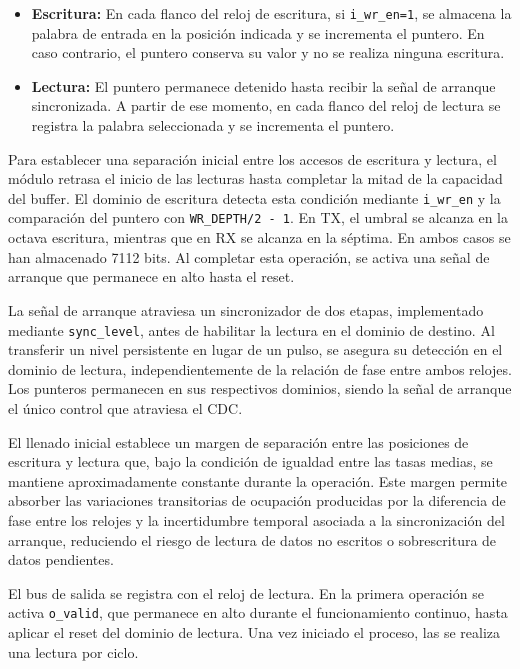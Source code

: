 \documentclass[10pt,a4paper]{article}
\begin{document}
\begin{itemize}
    \item \textbf{Escritura:}
    En cada flanco del reloj de escritura, si
    \texttt{i\_wr\_en=1}, se almacena la palabra de entrada
    en la posición indicada y se incrementa el puntero.
    En caso contrario, el puntero conserva su valor y
    no se realiza ninguna escritura.

    \item \textbf{Lectura:}
    El puntero permanece detenido hasta recibir la señal
    de arranque sincronizada. A partir de ese momento,
    en cada flanco del reloj de lectura se registra la
    palabra seleccionada y se incrementa el puntero.
\end{itemize}

Para establecer una separación inicial entre los accesos de
escritura y lectura, el módulo retrasa el inicio de las lecturas
hasta completar la mitad de la capacidad del buffer. El dominio
de escritura detecta esta condición mediante
\texttt{i\_wr\_en} y la comparación del puntero con
\texttt{WR\_DEPTH/2 - 1}. En TX, el umbral se alcanza
en la octava escritura, mientras que en RX se alcanza
en la séptima. En ambos casos se han almacenado 7112 bits.
Al completar esta operación, se activa una señal de arranque
que permanece en alto hasta el reset.

La señal de arranque atraviesa un sincronizador de dos etapas,
implementado mediante \texttt{sync\_level}, antes de habilitar
la lectura en el dominio de destino. Al transferir un nivel
persistente en lugar de un pulso, se asegura su detección
en el dominio de lectura, independientemente de la relación
de fase entre ambos relojes. Los punteros permanecen en sus
respectivos dominios, siendo la señal de arranque el único
control que atraviesa el CDC.

El llenado inicial establece un margen de separación entre
las posiciones de escritura y lectura que, bajo la condición
de igualdad entre las tasas medias, se mantiene aproximadamente
constante durante la operación. Este margen permite absorber
las variaciones transitorias de ocupación producidas por la
diferencia de fase entre los relojes y la incertidumbre
temporal asociada a la sincronización del arranque, reduciendo
el riesgo de lectura de datos no escritos o sobrescritura
de datos pendientes.

El bus de salida se registra con el reloj de lectura. En la
primera operación se activa \texttt{o\_valid}, que permanece
en alto durante el funcionamiento continuo, hasta aplicar
el reset del dominio de lectura. Una vez iniciado el proceso,
las se realiza una lectura por ciclo.
\end{document}

